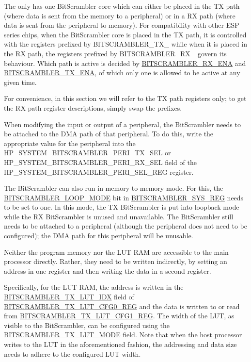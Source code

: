 \documentclass[main\_\_EN.tex]{subfiles}
\begin{document}
The \chipname{} only has one BitScrambler core which can either be placed in the TX path (where data is sent from the memory to a peripheral) or in a RX path (where data is sent from the peripheral to memory). For compatibility with other ESP series chips, when the BitScrambler core is placed in the TX path, it is controlled with the registers prefixed by BITSCRAMBLER\_TX\_ while when it is placed in the RX path, the registers prefixed by BITSCRAMBLER\_RX\_ govern its behaviour. Which path is active is decided by \hyperref[fielddesc:BITSCRAMBLERRXENA]{BITSCRAMBLER\_RX\_ENA} and
\hyperref[fielddesc:BITSCRAMBLERTXENA]{BITSCRAMBLER\_TX\_ENA}, of which only one is allowed to be active at any given time.

\begin{tiplisting}
For convenience, in this section we will refer to the TX path registers only; to get the RX path register descriptions, simply swap the prefixes.
\end{tiplisting}


When modifying the input or output of a peripheral, the BitScrambler needs to be attached to the DMA path of that peripheral. To do this, write the appropriate value for the peripheral into the HP\_SYSTEM\_BITSCRAMBLER\_PERI\_TX\_SEL or HP\_SYSTEM\_BITSCRAMBLER\_PERI\_RX\_SEL field of the HP\_SYSTEM\_BITSCRAMBLER\_PERI\_SEL\_REG register.

The  BitScrambler can also run in memory-to-memory mode. For this, the \hyperref[fielddesc:BITSCRAMBLERLOOPMODE]{BITSCRAMBLER\_LOOP\_MODE} bit in \hyperref[regdesc:BITSCRAMBLERSYSREG]{BITSCRAMBLER\_SYS\_REG} needs to be set to one. In this mode, the TX BitScrambler is put into loopback mode while the RX BitScrambler is unused and unavailable. The BitScrambler still needs to be attached to a peripheral (although the peripheral does not need to be configured); the DMA path for this peripheral will be unusable.

Neither the program memory nor the LUT RAM are accessible to the main processor directly. Rather, they need to be written indirectly, by setting an address in one register and then writing the data in a second register.

Specifically, for the LUT RAM, the address is written in the \hyperref[fielddesc:BITSCRAMBLERTXLUTIDX]{BITSCRAMBLER\_TX\_LUT\_IDX} field of \hyperref[regdesc:BITSCRAMBLERTXLUTCFG0REG]{BITSCRAMBLER\_TX\_LUT\_CFG0\_REG} and the data is written to or read from \hyperref[regdesc:BITSCRAMBLERTXLUTCFG1REG]{BITSCRAMBLER\_TX\_LUT\_CFG1\_REG}. The width of the LUT, as visible to the BitScrambler, can be configured using the \hyperref[fielddesc:BITSCRAMBLERTXLUTMODE]{BITSCRAMBLER\_TX\_LUT\_MODE} field. Note that when the host processor writes to the LUT in the aforementioned fashion, the addressing and data size needs to adhere to the configured LUT width.
\end{document}
